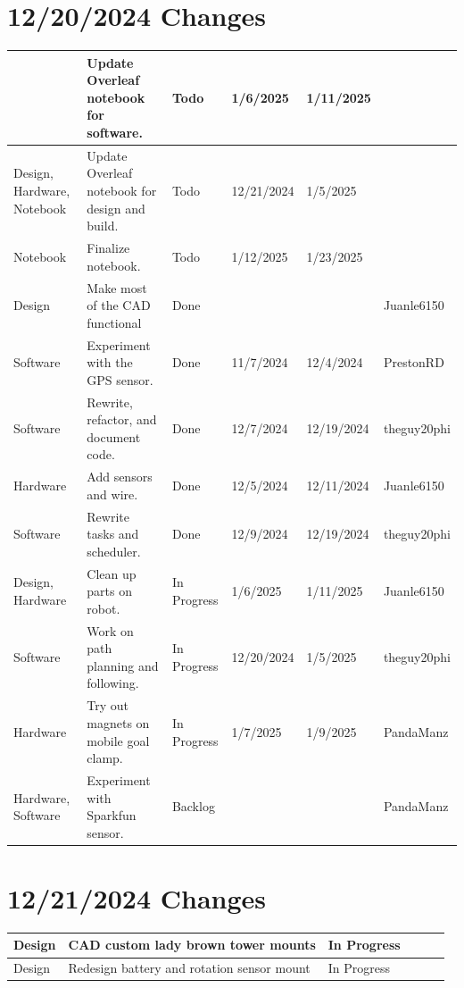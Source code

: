 \section{12/20/2024 Changes}
\begin{center}
\begin{longtable}{| p{40pt} | p{150pt} | p{35pt} | p{33pt} | p{33pt} | p{40pt} |}
\hline \rowcolor{IndianRed1}
& Update Overleaf notebook for software. & Todo & 1/6/2025 & 1/11/2025 & \\
\hline \rowcolor{IndianRed1}
Design, Hardware, Notebook & Update Overleaf notebook for design and build. & Todo & 12/21/2024 & 1/5/2025 & \\
\hline \rowcolor{IndianRed1}
Notebook & Finalize notebook. & Todo & 1/12/2025 & 1/23/2025 & \\
\hline \rowcolor{DarkSeaGreen1}
Design & Make most of the CAD functional & Done &  &  & Juanle6150 \\
\hline \rowcolor{DarkSeaGreen1}
Software & Experiment with the GPS sensor. & Done & 11/7/2024 & 12/4/2024 & PrestonRD \\
\hline \rowcolor{DarkSeaGreen1}
Software & Rewrite, refactor, and document code. & Done & 12/7/2024 & 12/19/2024 & theguy20phi \\
\hline \rowcolor{DarkSeaGreen1}
Hardware & Add sensors and wire. & Done & 12/5/2024 & 12/11/2024 & Juanle6150 \\
\hline \rowcolor{DarkSeaGreen1}
Software & Rewrite tasks and scheduler. & Done & 12/9/2024 & 12/19/2024 & theguy20phi \\
\hline \rowcolor{LightGoldenrod1}
Design, Hardware & Clean up parts on robot. & In Progress & 1/6/2025 & 1/11/2025 & Juanle6150 \\
\hline \rowcolor{LightGoldenrod1}
Software & Work on path planning and following. & In Progress & 12/20/2024 & 1/5/2025 & theguy20phi \\
\hline \rowcolor{LightGoldenrod1}
Hardware & Try out magnets on mobile goal clamp. & In Progress & 1/7/2025 & 1/9/2025 & PandaManz \\
\hline \rowcolor{Ivory2}
Hardware, Software & Experiment with Sparkfun sensor. & Backlog &  &  & PandaManz \\
\hline
\end{longtable}
\end{center}


\section{12/21/2024 Changes}
\begin{center}
\begin{longtable}{| p{40pt} | p{150pt} | p{35pt} | p{33pt} | p{33pt} | p{40pt} |}
\hline \rowcolor{LightGoldenrod1}
Design & CAD custom lady brown tower mounts & In Progress &  &  & \\
\hline \rowcolor{LightGoldenrod1}
Design & Redesign battery and rotation sensor mount & In Progress &  &  & \\
\hline
\end{longtable}
\end{center}


